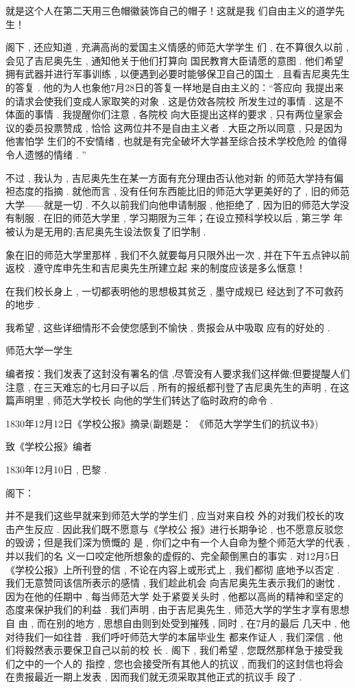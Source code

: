 就是这个人在第二天用三色帽徽装饰自己的帽子！这就是我 们自由主义的道学先生！

阁下 , 还应知道 , 充满高尚的爱国主义情感的师范大学学生 们 , 在不算很久以前 , 会见了吉尼奥先生 , 通知他关于他们打算向 国民教育大臣请愿的意图 . 他们希望拥有武器并进行军事训练 ,  以便遇到必要时能够保卫自己的国土 . 且看吉尼奥先生的答复 .  他的为人也象他7月28日的答复一样地是自由主义的：“答应向 我提出来的请求会使我们变成人家取笑的对象 . 这是仿效各院校 所发生过的事情 . 这是不体面的事情 . 我提醒你们注意 , 各院校 向大臣提出这样的要求 , 只有两位皇家会议的委员投票赞成 , 恰恰 这两位并不是自由主义者 . 大臣之所以同意 , 只是因为他害怕学 生们的不安情绪 , 也就是有完全破坏大学甚至综合技术学校危险 的值得令人遗憾的情绪 . ”

不过 , 我认为 , 吉尼奥先生在某一方面有充分理由否认他对新 的师范大学持有偏袒态度的指摘 . 就他而言 , 没有任何东西能比旧的师范大学更美好的了 , 旧的师范大学——就是一切 . 不久以前我们向他申请制服 , 他拒绝了 , 因为旧的师范大学没有制服 . 在旧的师范大学里 , 学习期限为三年；在设立预科学校以后 , 第三学 年被认为是无用的;吉尼奥先生设法恢复了旧学制 . 

象在旧的师范大学里那样 , 我们不久就要每月只限外出一次 ,  并在下午五点钟以前返校 . 遵守库申先生和吉尼奥先生所建立起 来的制度应该是多么惬意！

在我们校长身上 , 一切都表明他的思想极其贫乏 , 墨守成规已 经达到了不可救药的地步 . 

我希望 , 这些详细情形不会使您感到不愉快 , 贵报会从中吸取 应有的好处的 . 

\begin{flushright}
	师范大学一学生
\end{flushright}

编者按：我们发表了这封没有署名的信 ,尽管没有人要求我们这样做;但要提醍人们注意 , 在三天难忘的七月曰子以后 , 所有的报纸都刊登了吉尼奥先生的声明 , 在这篇声明里 , 师范大学校长 向他的学生们转达了临时政府的命令 . 

\begin{center}
	1830年12月12日《学校公报》摘录(副题是：
《师范大学学生们的抗议书》) 

致《学校公报》编者

1830年12月10日 , 巴黎 . 
\end{center}

阁下：

并不是我们这些早就来到师范大学的学生们 , 应当对来自校 外的对我们校长的攻击产生反应 . 因此我们既不愿意与《学校公 报》进行长期争论 , 也不愿意反驳您的毁谤；但是我们深为愤慨的 是 , 你们之中有一个人自命为整个师范大学的代表 , 并以我们的名 义一口咬定他所想象的虚假的、完全颠倒黑白的事实 . 对12月5日《学校公报》上所刊登的信 , 不论在内容上或形式上 , 我们都彻 底地予以否定 . 我们无意赞同该信所表示的感情 , 我们趁此机会 向吉尼奥先生表示我们的谢忱 , 因为在他的任期中 , 每当师范大学 处于紧耍关头时 , 他都以高尚的精神和坚定的态度来保护我们的利益 . 我们声明 , 由于吉尼奥先生 , 师范大学的学生才享有思想自 由 , 而在别的地方 , 思想自由则到处受到摧残 , 同时 , 在7月的最后 几天中 , 他对待我们一如往昔 . 我们呼吁师范大学的本届毕业生 都来作证人 , 我们深信 , 他们将毅然表示要保卫自己以前的校 长 . 阁下 , 我们希望 , 您既然那样急于接受我们之中的一个人的 指控 , 您也会接受所有其他人的抗议 , 而我们的这封信也将会 在贵报最近一期上发表 , 因而我们就无须采取其他正式的抗议手 段了 . 

